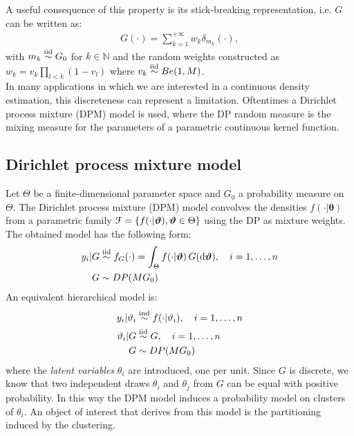 A useful consequence of this property is its stick-breaking representation, i.e. $G$ can be written as:
\begin{align*}
	G(\cdot) = \sum_{k=1}^{+\infty} w_k \delta_{m_k} (\cdot),
\end{align*}
with $m_k \stackrel{\text{iid}}{\sim} G_0$ for $k\in\mathbb{N}$ and the random weights constructed as $w_k =v_k\prod\limits_{l<k} (1-v_l)$ where $v_k \stackrel{\text{iid}}{\sim} Be(1,M)$. \\
In many applications in which we are interested in a continuous density estimation, this discreteness can represent a limitation.
Oftentimes a Dirichlet process mixture (DPM) model is used, where the DP random measure is the mixing measure for the parameters of a parametric continuous kernel function.

\subsection{Dirichlet process mixture model}
Let $\Theta$ be a finite-dimensional parameter space and $G_0$ a probability measure on $\Theta$.
The Dirichlet process mixture (DPM) model convolves the densities $f(\cdot|\boldsymbol\theta)$ from a parametric family $\mathcal F = \{f(\cdot|\boldsymbol{\vartheta}), \boldsymbol{\vartheta} \in \Theta \}$ using the DP as mixture weights.
The obtained model has the following form:
\begin{equation}
	\begin{aligned}\label{dpm-1}
	y_i | G &\stackrel{\text{iid}}{\sim} f_G(\cdot) = \int_\Theta f(\cdot|\boldsymbol{\vartheta}) \, G(\mathrm d\boldsymbol{\vartheta}), \quad i=1,\dots,n \\
	G &\sim DP(M G_0)
	\end{aligned}
\end{equation}
An equivalent hierarchical model is:
\begin{equation}
	\begin{aligned}\label{dpm-2}
	y_i | \vartheta_i &\stackrel{\text{ind}}{\sim} f(\cdot|\vartheta_i), \quad i=1,\dots,n \\
	\vartheta_i | G &\stackrel{\text{iid}}{\sim} G, \quad i=1,\dots,n \\ 
	G &\sim DP(M G_0)
	\end{aligned}
\end{equation}
where the \emph{latent variables} $\theta_i$ are introduced, one per unit.
Since $G$ is discrete, we know that two independent draws $\theta_i$ and $\theta_j$ from $G$ can be equal with positive probability.
In this way the DPM model induces a probability model on clusters of $\theta_i$.
An object of interest that derives from this model is the partitioning induced by the clustering. \\%

